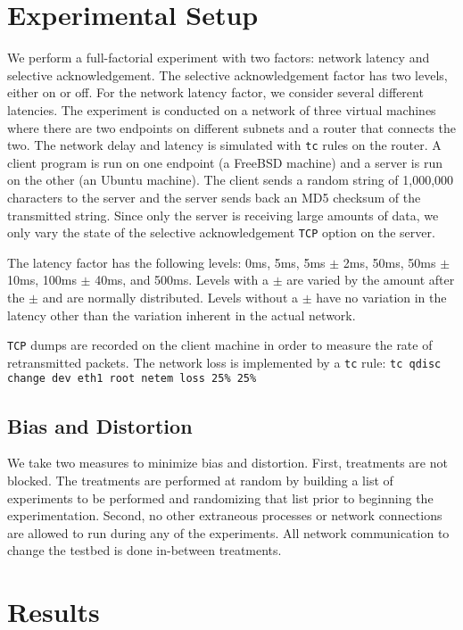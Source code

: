 \documentclass[]{article}
\begin{document}
\section{Experimental Setup}\label{setup}
We perform a full-factorial experiment with two factors: network latency and
selective acknowledgement. The selective acknowledgement factor has two levels,
either on or off. For the network latency factor, we consider several different
latencies. The experiment is conducted on a network of three virtual machines 
where there are two endpoints on different subnets and a router that connects 
the two. The network delay and latency is simulated with \texttt{tc} rules on 
the router. A client program is run on one endpoint (a FreeBSD machine) and a 
server is run on the other (an Ubuntu machine). The client sends a random string 
of 1,000,000 characters to the server and the server sends back an MD5 checksum 
of the transmitted string. Since only the server is receiving large amounts of 
data, we only vary the state of the selective acknowledgement \texttt{TCP} option 
on the server. 

The latency factor has the following levels: 0ms, 5ms, 5ms $\pm$ 2ms, 50ms, 50ms 
$\pm$ 10ms, 100ms $\pm$ 40ms, and 500ms. Levels with a $\pm$ are varied by the 
amount after the $\pm$ and are normally distributed. Levels without a $\pm$ have 
no variation in the latency other than the variation inherent in the actual network.

\texttt{TCP} dumps are recorded on the client machine in order to
measure the rate of retransmitted packets. The network loss is implemented by a
\texttt{tc} rule: \texttt{tc qdisc change dev eth1 root netem loss 25\% 25\%}


\subsection{Bias and Distortion}
We take two measures to minimize bias and distortion.
First, treatments are not blocked. The treatments are performed at random by
building a list of experiments to be performed and randomizing that list prior
to beginning the experimentation. Second, no other extraneous processes or 
network connections are allowed to run during any of the experiments. All
network communication to change the testbed is done in-between treatments.

\section{Results}\label{results}
\end{document}
